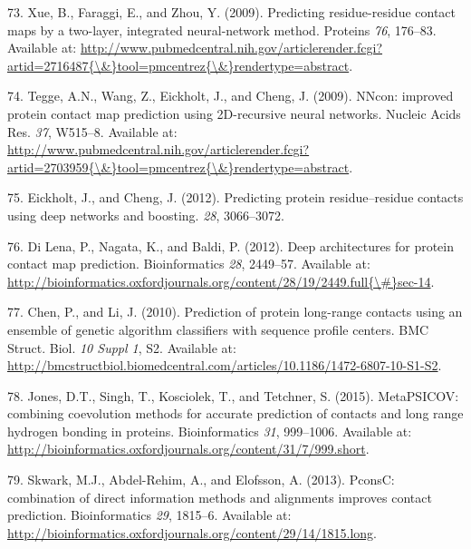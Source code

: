 \documentclass[11pt,a4paper,twoside]{book}
\theoremstyle{definition}
\theoremstyle{definition}
\theoremstyle{remark}
\begin{document}
\hypertarget{ref-Xue2009a}{}
73. Xue, B., Faraggi, E., and Zhou, Y. (2009). Predicting
residue-residue contact maps by a two-layer, integrated neural-network
method. Proteins \emph{76}, 176--83. Available at:
\href{http://www.pubmedcentral.nih.gov/articlerender.fcgi?artid=2716487\%7B/\&\%7Dtool=pmcentrez\%7B/\&\%7Drendertype=abstract}{http://www.pubmedcentral.nih.gov/articlerender.fcgi?artid=2716487\{\textbackslash{}\&\}tool=pmcentrez\{\textbackslash{}\&\}rendertype=abstract}.

\hypertarget{ref-Tegge2009a}{}
74. Tegge, A.N., Wang, Z., Eickholt, J., and Cheng, J. (2009). NNcon:
improved protein contact map prediction using 2D-recursive neural
networks. Nucleic Acids Res. \emph{37}, W515--8. Available at:
\href{http://www.pubmedcentral.nih.gov/articlerender.fcgi?artid=2703959\%7B/\&\%7Dtool=pmcentrez\%7B/\&\%7Drendertype=abstract}{http://www.pubmedcentral.nih.gov/articlerender.fcgi?artid=2703959\{\textbackslash{}\&\}tool=pmcentrez\{\textbackslash{}\&\}rendertype=abstract}.

\hypertarget{ref-Eickholt2012}{}
75. Eickholt, J., and Cheng, J. (2012). Predicting protein
residue--residue contacts using deep networks and boosting. \emph{28},
3066--3072.

\hypertarget{ref-DiLena2012a}{}
76. Di Lena, P., Nagata, K., and Baldi, P. (2012). Deep architectures
for protein contact map prediction. Bioinformatics \emph{28}, 2449--57.
Available at:
\href{http://bioinformatics.oxfordjournals.org/content/28/19/2449.full\%7B/\#\%7Dsec-14}{http://bioinformatics.oxfordjournals.org/content/28/19/2449.full\{\textbackslash{}\#\}sec-14}.

\hypertarget{ref-Chen2010}{}
77. Chen, P., and Li, J. (2010). Prediction of protein long-range
contacts using an ensemble of genetic algorithm classifiers with
sequence profile centers. BMC Struct. Biol. \emph{10 Suppl 1}, S2.
Available at:
\url{http://bmcstructbiol.biomedcentral.com/articles/10.1186/1472-6807-10-S1-S2}.

\hypertarget{ref-Jones2015}{}
78. Jones, D.T., Singh, T., Kosciolek, T., and Tetchner, S. (2015).
MetaPSICOV: combining coevolution methods for accurate prediction of
contacts and long range hydrogen bonding in proteins. Bioinformatics
\emph{31}, 999--1006. Available at:
\url{http://bioinformatics.oxfordjournals.org/content/31/7/999.short}.

\hypertarget{ref-Skwark2013}{}
79. Skwark, M.J., Abdel-Rehim, A., and Elofsson, A. (2013). PconsC:
combination of direct information methods and alignments improves
contact prediction. Bioinformatics \emph{29}, 1815--6. Available at:
\url{http://bioinformatics.oxfordjournals.org/content/29/14/1815.long}.
\end{document}
